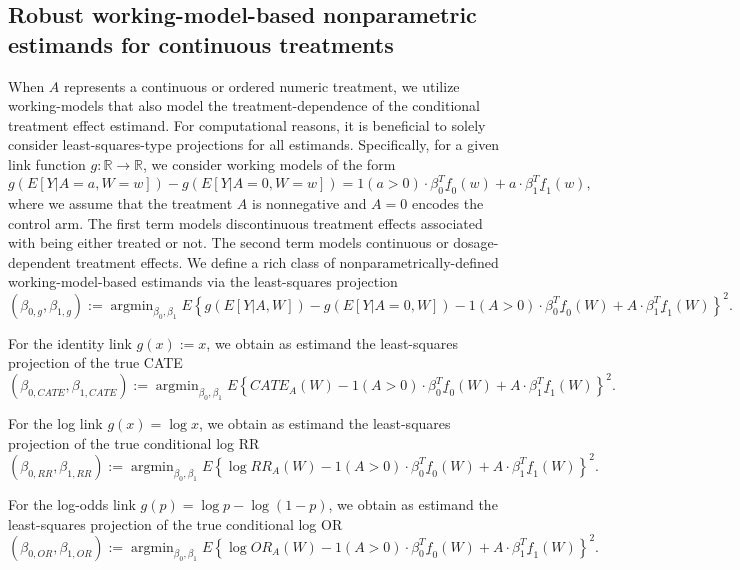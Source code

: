 \documentclass[
]{jss}
\DeclareMathOperator{\argmin}{argmin}
\begin{document}
\subsection{Robust working-model-based nonparametric estimands for continuous treatments}

When \(A\) represents a continuous or ordered numeric treatment, we
utilize working-models that also model the treatment-dependence of the
conditional treatment effect estimand. For computational reasons, it is
beneficial to solely consider least-squares-type projections for all
estimands. Specifically, for a given link function
\(g:\mathbb{R} \rightarrow \mathbb{R}\), we consider working models of
the form
\[g(E[Y|A=a,W=w]) - g(E[Y|A=0,W=w]) = 1(a>0)\cdot \beta_0^T \underline{f}_0(w) +  a \cdot \beta_1^T \underline{f}_1(w),\]
where we assume that the treatment \(A\) is nonnegative and \(A=0\)
encodes the control arm. The first term models discontinuous treatment
effects associated with being either treated or not. The second term
models continuous or dosage-dependent treatment effects. We define a
rich class of nonparametrically-defined working-model-based estimands
via the least-squares projection
\[(\beta_{0,g}, \beta_{1,g}) := \argmin_{\beta_0, \beta_1} E \left\{ g(E[Y|A,W]) - g(E[Y|A=0,W])  - 1(A>0)\cdot \beta_0^T \underline{f}_0(W) +  A \cdot \beta_1^T \underline{f}_1(W)\right\}^2.\]

For the identity link \(g(x) := x\), we obtain as estimand the
least-squares projection of the true CATE
\[ (\beta_{0,CATE}, \beta_{1,CATE}) := \argmin_{\beta_0, \beta_1} E \left\{ CATE_A(W)  - 1(A>0)\cdot \beta_0^T \underline{f}_0(W) +  A \cdot \beta_1^T \underline{f}_1(W)\right\}^2.\]

For the log link \(g(x) = \log x\), we obtain as estimand the
least-squares projection of the true conditional log RR
\[ (\beta_{0,RR}, \beta_{1,RR}) :=  \argmin_{\beta_0, \beta_1} E \left\{ \log RR_{A}(W)  - 1(A>0)\cdot \beta_0^T \underline{f}_0(W) +  A \cdot \beta_1^T \underline{f}_1(W)\right\}^2.\]

For the log-odds link \(g(p) = \log p - \log (1-p)\), we obtain as
estimand the least-squares projection of the true conditional log OR
\[ (\beta_{0,OR}, \beta_{1,OR}) :=  \argmin_{\beta_0, \beta_1} E \left\{ \log OR_{A}(W)  - 1(A>0)\cdot \beta_0^T \underline{f}_0(W) +  A \cdot \beta_1^T \underline{f}_1(W)\right\}^2.\]
\end{document}
